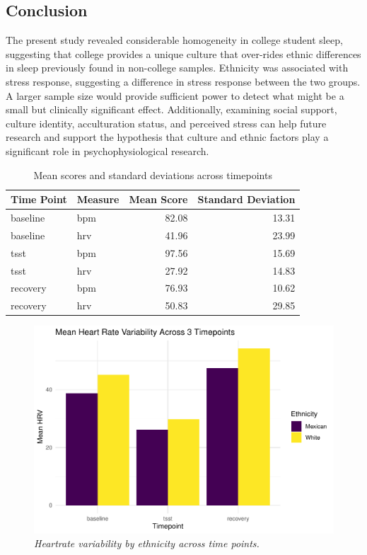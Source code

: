 \documentclass[man, fleqn, noextraspace]{apa6}
\begin{document}
\hypertarget{conclusion}{%
\subsection{Conclusion}\label{conclusion}}

The present study revealed considerable homogeneity in college student sleep, suggesting that college provides a unique culture that over-rides ethnic differences in sleep previously found in non-college samples. Ethnicity was associated with stress response, suggesting a difference in stress response between the two groups. A larger sample size would provide sufficient power to detect what might be a small but clinically significant effect. Additionally, examining social support, culture identity, acculturation status, and perceived stress can help future research and support the hypothesis that culture and ethnic factors play a significant role in psychophysiological research.

\newpage

\begin{table}

\caption{\label{tab:unnamed-chunk-1}Mean scores and standard deviations across timepoints}
\centering
\begin{tabular}[t]{l|l|r|r}
\hline
Time Point & Measure & Mean Score & Standard Deviation\\
\hline
baseline & bpm & 82.08 & 13.31\\
\hline
baseline & hrv & 41.96 & 23.99\\
\hline
tsst & bpm & 97.56 & 15.69\\
\hline
tsst & hrv & 27.92 & 14.83\\
\hline
recovery & bpm & 76.93 & 10.62\\
\hline
recovery & hrv & 50.83 & 29.85\\
\hline
\end{tabular}
\end{table}

\begin{figure}
\centering
\includegraphics{PAPAJA_Final_class_project_files/figure-latex/unnamed-chunk-2-1.pdf}
\caption{\label{fig:unnamed-chunk-2}\emph{Heartrate variability by ethnicity across time points.}}
\end{figure}
\end{document}

